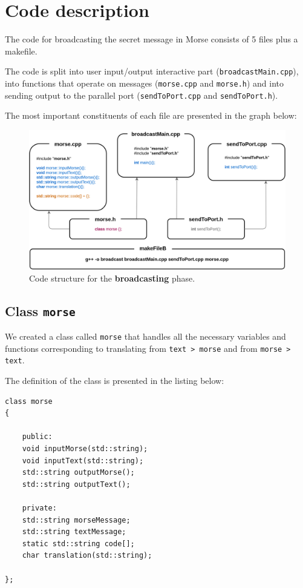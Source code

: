 \documentclass[12pt]{report}
\begin{document}
\section{Code description}

The code for broadcasting the secret message in Morse consists of 5 files plus a makefile.

The code is split into user input/output interactive part (\verb|broadcastMain.cpp|), into functions that operate on messages (\verb|morse.cpp| and \verb|morse.h|) and into sending output to the parallel port (\verb|sendToPort.cpp| and \verb|sendToPort.h|).

The most important constituents of each file are presented in the graph below:

\begin{figure}[H]
\centering\includegraphics[width=15cm]{bCodeStructure}
\caption{Code structure for the \textbf{broadcasting} phase.}				
\label{fig:br_code}
\end{figure}

\subsection{Class \texttt{morse}}

We created a class called \verb|morse| that handles all the necessary variables and functions corresponding to translating from \verb|text > morse| and from \verb|morse > text|.

The definition of the class is presented in the listing below:

\begin{lstlisting}
class morse
{

	public:
	void inputMorse(std::string);
	void inputText(std::string);
	std::string outputMorse();
	std::string outputText();

	private:
	std::string morseMessage;
	std::string textMessage;
	static std::string code[];
	char translation(std::string);

};
\end{lstlisting}
\end{document}
